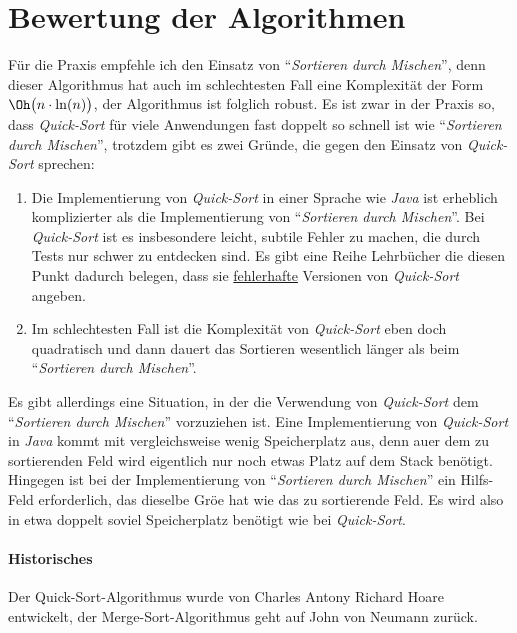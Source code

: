 \section{Bewertung der Algorithmen}
F\"ur die Praxis empfehle ich den Einsatz von ``\emph{Sortieren durch Mischen}'', denn dieser Algorithmus hat auch im schlechtesten Fall 
eine Komplexit\"at der Form $\Oh\bigl(n\cdot \ln(n)\bigr)$, der Algorithmus ist folglich robust.
Es ist zwar in der Praxis so, dass \emph{Quick-Sort} f\"ur viele Anwendungen fast doppelt   
so schnell ist wie ``\emph{Sortieren durch Mischen}'', trotzdem gibt es zwei Gr\"unde, die gegen den Einsatz von
\emph{Quick-Sort} sprechen:
\begin{enumerate}
\item Die Implementierung von \emph{Quick-Sort} in einer Sprache wie \textsl{Java} ist erheblich komplizierter als 
      die Implementierung von ``\emph{Sortieren durch Mischen}''.
      Bei \emph{Quick-Sort} ist es insbesondere leicht, subtile Fehler zu machen, die durch Tests nur schwer 
      zu entdecken sind.  Es gibt eine Reihe Lehrb\"ucher die diesen Punkt dadurch belegen, dass sie
      \underline{fehlerhafte} Versionen von \emph{Quick-Sort} angeben.
\item Im schlechtesten Fall ist die Komplexit\"at von \emph{Quick-Sort} eben doch quadratisch und dann dauert das
      Sortieren wesentlich l\"anger als beim ``\emph{Sortieren durch Mischen}''.
\end{enumerate}
Es gibt allerdings eine Situation, in der die Verwendung von \emph{Quick-Sort} dem ``\emph{Sortieren durch Mischen}'' 
vorzuziehen ist.  Eine Implementierung von \emph{Quick-Sort} in \textsl{Java} kommt mit vergleichsweise wenig Speicherplatz aus,
denn au\3er dem zu sortierenden Feld wird eigentlich nur noch etwas Platz auf dem Stack ben\"otigt.  Hingegen
ist bei der Implementierung von ``\emph{Sortieren durch Mischen}'' ein Hilfs-Feld erforderlich, das dieselbe Gr\"o\3e hat
wie das zu sortierende Feld.  Es wird also in etwa doppelt soviel Speicherplatz ben\"otigt wie bei 
\emph{Quick-Sort}.

\paragraph{Historisches}  
Der Quick-Sort-Algorithmus wurde von Charles Antony Richard Hoare \cite{hoare:61}
entwickelt, der Merge-Sort-Algorithmus geht auf John von Neumann zur\"uck.

